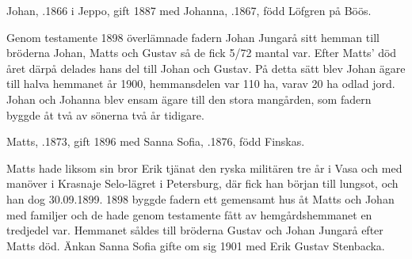Johan, .1866 i Jeppo, gift 1887 med Johanna, .1867, född Löfgren på Böös.
\begin{jhchildren}
  \item {}
  \item {}
  \item {}
  \item {}
  \item {}
  \item {}
\end{jhchildren}
Genom testamente 1898 överlämnade fadern Johan Jungarå sitt hemman till bröderna Johan, Matts och Gustav så de fick 5/72 mantal var. Efter Matts' död året därpå delades hans del till Johan och Gustav. På detta sätt blev Johan ägare till halva hemmanet år 1900, hemmansdelen var 110 ha, varav 20 ha odlad jord. Johan och Johanna blev ensam ägare till den stora mangården, som fadern byggde åt två av sönerna två år tidigare.


Matts, .1873, gift 1896 med Sanna Sofia, .1876, född Finskas.
\begin{jhchildren}
  \item {}
  \item {}
\end{jhchildren}
Matts hade liksom sin bror Erik tjänat den ryska militären tre år i Vasa och med manöver i Krasnaje Selo-lägret i Petersburg, där fick han början till lungsot, och han dog 30.09.1899. 1898 byggde fadern ett gemensamt hus åt Matts och Johan med familjer och de hade genom testamente fått av hemgårdshemmanet en tredjedel var. Hemmanet såldes till bröderna Gustav och Johan Jungarå efter Matts död. Änkan Sanna Sofia gifte om sig 1901 med Erik Gustav Stenbacka.



